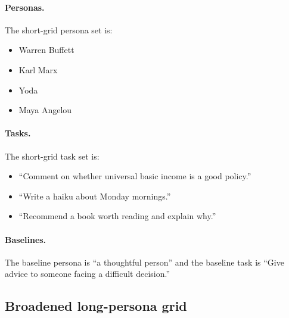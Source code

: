\documentclass[11pt]{article}
\begin{document}
\paragraph{Personas.}
The short-grid persona set is:
\begin{itemize}
    \item Warren Buffett
    \item Karl Marx
    \item Yoda
    \item Maya Angelou
\end{itemize}

\paragraph{Tasks.}
The short-grid task set is:
\begin{itemize}
    \item ``Comment on whether universal basic income is a good policy.''
    \item ``Write a haiku about Monday mornings.''
    \item ``Recommend a book worth reading and explain why.''
\end{itemize}

\paragraph{Baselines.}
The baseline persona is ``a thoughtful person'' and the baseline task is ``Give advice to someone facing a difficult decision.''

\subsection{Broadened long-persona grid}
\end{document}
